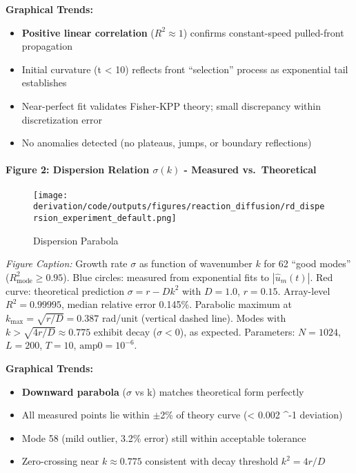 \documentclass[
]{article}
\providecommand{\tightlist}{%
  \setlength{\itemsep}{0pt}\setlength{\parskip}{0pt}}
\begin{document}
\textbf{Graphical Trends:}

\begin{itemize}
\tightlist
\item
  \textbf{Positive linear correlation} (\(R^{2} \approx 1\)) confirms
  constant-speed pulled-front propagation
\item
  Initial curvature (t \textless{} 10) reflects front ``selection''
  process as exponential tail establishes
\item
  Near-perfect fit validates Fisher-KPP theory; small discrepancy within
  discretization error
\item
  No anomalies detected (no plateaus, jumps, or boundary reflections)
\end{itemize}

\hypertarget{figure-2-dispersion-relation-ux3c3k---measured-vs.-theoretical}{%
\paragraph{\texorpdfstring{\textbf{Figure 2: Dispersion Relation $\sigma(k)$ -
Measured
vs.~Theoretical}}{Figure 2: Dispersion Relation $\sigma(k)$ - Measured vs.~Theoretical}}\label{figure-2-dispersion-relation-ux3c3k---measured-vs.-theoretical}}

\begin{figure}
\centering
\texttt{[image: derivation/code/outputs/figures/reaction\_diffusion/rd\_dispersion\_experiment\_default.png]}
\caption{Dispersion Parabola}
\end{figure}

\emph{Figure Caption:} Growth rate \(\sigma\) as function of wavenumber
\(k\) for 62 ``good modes'' (\(R^{2}_{\text{mode}} \ge 0.95\)). Blue
circles: measured from exponential fits to \(|\hat u_m(t)|\). Red curve:
theoretical prediction \(\sigma = r - Dk^{2}\) with \(D=1.0\),
\(r=0.15\). Array-level \(R^{2} = 0.99995\), median relative error
0.145\%. Parabolic maximum at \(k_{\max} = \sqrt{r/D} = 0.387\) rad/unit
(vertical dashed line). Modes with \(k > \sqrt{4r/D} \approx 0.775\)
exhibit decay (\(\sigma < 0\)), as expected. Parameters: \(N=1024\),
\(L=200\), \(T=10\), \(\text{amp0}=10^{-6}\).

\textbf{Graphical Trends:}

\begin{itemize}
\tightlist
\item
  \textbf{Downward parabola} ($\sigma$ vs k) matches theoretical form perfectly
\item
  All measured points lie within $\pm$2\% of theory curve (\textless{} 0.002
  ^{-1} deviation)
\item
  Mode 58 (mild outlier, 3.2\% error) still within acceptable tolerance
\item
  Zero-crossing near \(k \approx 0.775\) consistent with decay threshold
  \(k^{2} = 4r/D\)
\end{itemize}
\end{document}
